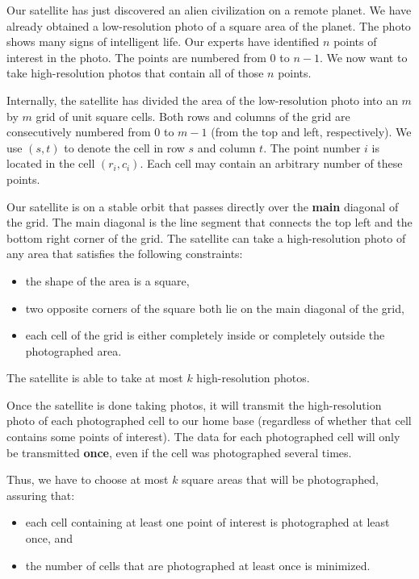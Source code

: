 Our satellite has just discovered an alien civilization on a remote planet. 
We have already obtained a low-resolution photo of a square area of the planet. 
The photo shows many signs of intelligent life. Our experts have identified 
$n$ points of interest in the photo. The points are numbered from $0$ to
$n - 1$. We now want to take high-resolution photos that contain all of those
$n$ points.

Internally, the satellite has divided the area of the low-resolution 
photo into an $m$ by $m$ grid of unit square cells. Both rows and
columns of the grid are consecutively numbered from $0$ to $m - 1$ 
(from the top and left, respectively). We use $(s, t)$ to denote the
cell in row $s$ and column $t$. The point number $i$ is located 
in the cell $(r_i, c_i)$. Each cell may contain an arbitrary number
of these points.

Our satellite is on a stable orbit that passes directly over the
\textbf{main} diagonal of the grid. The main diagonal is the line
segment that connects the top left and the bottom right corner of 
the grid. The satellite can take a high-resolution photo of any
area that satisfies the following constraints:

\begin{itemize}
\item the shape of the area is a square,
\item two opposite corners of the square both lie on the main diagonal of the grid,
\item each cell of the grid is either completely inside or completely outside the photographed area.
\end{itemize}

The satellite is able to take at most $k$ high-resolution photos.

Once the satellite is done taking photos, it will transmit the 
high-resolution photo of each photographed cell to our home base
(regardless of whether that cell contains some points of interest).
The data for each photographed cell will only be transmitted \textbf{once},
even if the cell was photographed several times.

Thus, we have to choose at most $k$ square areas that will be photographed, 
assuring that:

\begin{itemize}
 \item each cell containing at least one point of interest is photographed 
 at least once, and
 \item the number of cells that are photographed at least once is minimized.
\end{itemize}

